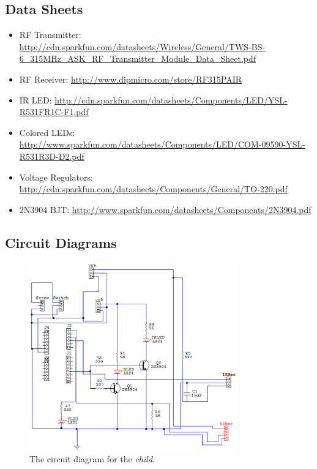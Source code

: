 \documentclass[12pt]{article}
\begin{document}
\clearpage
\subsection*{Data Sheets}
\begin{itemize}
\item{RF Transmitter: \url{http://cdn.sparkfun.com/datasheets/Wireless/General/TWS-BS-6_315MHz_ASK_RF_Transmitter_Module_Data_Sheet.pdf}}
\item{RF Receiver: \url{http://www.dipmicro.com/store/RF315PAIR}}
\item{IR LED: \url{http://cdn.sparkfun.com/datasheets/Components/LED/YSL-R531FR1C-F1.pdf}}
\item{Colored LEDs: \url{http://www.sparkfun.com/datasheets/Components/LED/COM-09590-YSL-R531R3D-D2.pdf}}
\item{Voltage Regulators: \url{http://cdn.sparkfun.com/datasheets/Components/General/TO-220.pdf}}
\item{2N3904 BJT: \url{http://www.sparkfun.com/datasheets/Components/2N3904.pdf}}
\end{itemize}

\clearpage

\subsection*{Circuit Diagrams}
\begin{figure}[ht!]
\centering %
\includegraphics[width=0.8\textwidth]{CKT-child.eps} 
\caption{The circuit diagram for the \emph{child}.} \label{ckt-child}
\end{figure}
\end{document}
